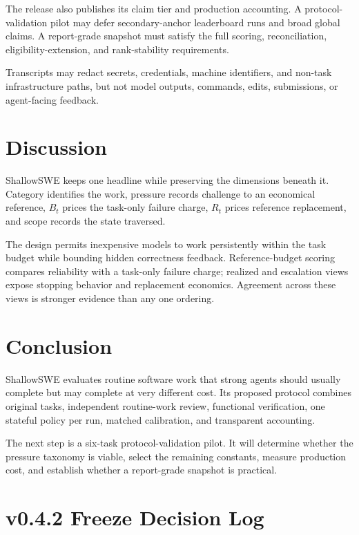 \documentclass[11pt]{article}
\newcommand{\appendixsection}[2]{\section{#2}}
\begin{document}
The release also publishes its claim tier and production accounting. A protocol-validation pilot may defer secondary-anchor leaderboard runs and broad global claims. A report-grade snapshot must satisfy the full scoring, reconciliation, eligibility-extension, and rank-stability requirements.

Transcripts may redact secrets, credentials, machine identifiers, and non-task infrastructure paths, but not model outputs, commands, edits, submissions, or agent-facing feedback.

\section{Discussion}\hypertarget{15-discussion}{}\label{15-discussion}

ShallowSWE keeps one headline while preserving the dimensions beneath it. Category identifies the work, pressure records challenge to an economical reference, $B_t$ prices the task-only failure charge, $R_t$ prices reference replacement, and scope records the state traversed.

The design permits inexpensive models to work persistently within the task budget while bounding hidden correctness feedback. Reference-budget scoring compares reliability with a task-only failure charge; realized and escalation views expose stopping behavior and replacement economics. Agreement across these views is stronger evidence than any one ordering.

\section{Conclusion}\hypertarget{16-conclusion}{}\label{16-conclusion}

ShallowSWE evaluates routine software work that strong agents should usually complete but may complete at very different cost. Its proposed protocol combines original tasks, independent routine-work review, functional verification, one stateful policy per run, matched calibration, and transparent accounting.

The next step is a six-task protocol-validation pilot. It will determine whether the pressure taxonomy is viable, select the remaining constants, measure production cost, and establish whether a report-grade snapshot is practical.

\appendix
\appendixsection{A}{v0.4.2 Freeze Decision Log}\hypertarget{appendix-a-v042-freeze-decision-log}{}\label{appendix-a-v042-freeze-decision-log}
\end{document}
